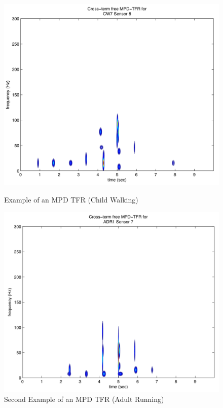 \documentclass{article}[11pt]
\begin{document}
\begin{figure}[H]
\centering
\begin{minipage}[b]{0.45\linewidth}
\includegraphics[scale = 0.4]{Images/MPD.pdf}
\caption{Example of an MPD TFR (Child Walking)}
\label{fig:MPDTFR1}
\end{minipage}
\hfill
\begin{minipage}[b]{0.45\linewidth}
\includegraphics[scale = 0.4]{Images/MPD2.pdf}
\caption{Second Example of an MPD TFR (Adult Running)}
\label{fig:MPDTFR2}
\end{minipage}
\end{figure}
\end{document}
